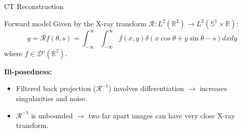 \begin{frame}{CT Reconstruction}

\begin{block}{Forward model}
Given by the X-ray transform $\mathcal{R}: L^2(\mathbb{R}^2)\longrightarrow L^2(\mathbb{S}^1\times\mathbb{R})$:
$$
g = \mathcal{R}f(\theta,s)= \int_{-\infty}^{\infty}\int_{-\infty}^{\infty}f(x,y)\delta(x\cos\theta+y\sin\theta-s)dxdy
$$
where $f\in \mathcal{D}'(\mathbb{R}^2)$.
\end{block}

\pause
\bigskip

\textbf{Ill-posedness:}    
\begin{itemize}
\item Filtered back projection ($\mathcal{R}^{-1}$) involves differentiation $\longrightarrow$ increases singularities and noise.
 
\item $\mathcal{R}^{-1}$ is unbounded $\longrightarrow$ two far apart images can have very close X-ray transform.
\end{itemize}
\end{frame}


